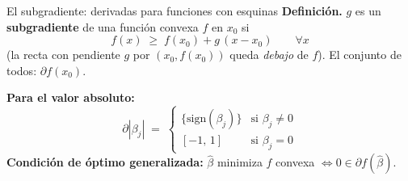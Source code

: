 \documentclass{beamer}
\newcommand{\1}{\mathbb{I}}
\newcommand{\sign}{\mathrm{sign}}
\begin{document}
\begin{frame}{El subgradiente: derivadas para funciones con esquinas}
\small
\textbf{Definición.} $g$ es un \textbf{subgradiente} de una función convexa $f$ en $x_0$ si
\[ f(x) \;\geq\; f(x_0) + g\,(x - x_0) \qquad \forall x \]
(la recta con pendiente $g$ por $(x_0, f(x_0))$ queda \emph{debajo} de $f$). El conjunto de todos: $\partial f(x_0)$.

\vspace{0.15cm}
\begin{center}
\end{center}
\pause

\textbf{Para el valor absoluto:}
\[ \partial |\beta_j| \;=\; \begin{cases} \{\sign(\beta_j)\} & \text{si } \beta_j \neq 0 \\ [-1, \, 1] & \text{si } \beta_j = 0 \end{cases} \]
\pause
\textbf{Condición de óptimo generalizada:} $\hat{\beta}$ minimiza $f$ convexa $\iff 0 \in \partial f(\hat{\beta})$.
\end{frame}
\end{document}
